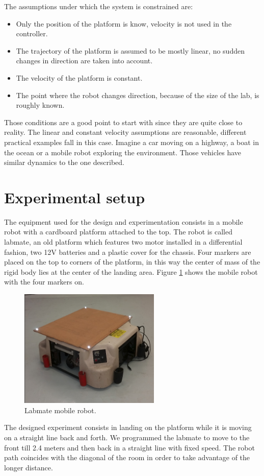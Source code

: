 The assumptions under which the system is constrained are:
\begin{itemize}
\item Only the position of the platform is know, velocity is not used in the controller.
\item The trajectory of the platform is assumed to be mostly linear, no sudden changes in direction are taken into account.
\item The velocity of the platform is constant.
\item The point where the robot changes direction, because of the size  of the lab, is roughly known.
\end{itemize}
Those conditions are a good point to start with since they are quite close to reality. The linear and constant velocity assumptions are reasonable, different practical examples fall in this case. Imagine a car moving on a highway, a boat in the ocean or a mobile robot exploring the environment. Those vehicles have similar dynamics to the one described.

\section{Experimental setup}
The equipment used for the design and experimentation consists in a mobile robot with a cardboard platform attached to the top. The robot is called labmate, an old platform which features two motor installed in a differential fashion, two 12V batteries and a plastic cover for the chassis. Four markers are placed on the top to corners of the platform, in this way the center of mass of the rigid body lies at the center of the landing area. Figure \ref{figure:labmate} shows the mobile robot with the four markers on. 
\begin{figure}[h]
 \centering
   \includegraphics[width = 0.6\textwidth ]{labmate.png}
    \caption{Labmate mobile robot.}
   \label{figure:labmate}
\end{figure}
The designed experiment consists in landing on the platform while it is moving on a straight line back and forth. We programmed the labmate to move to the front till 2.4 meters and then back in a straight line with fixed speed. The robot path coincides with the diagonal of the room in order to take advantage of the longer distance. 

